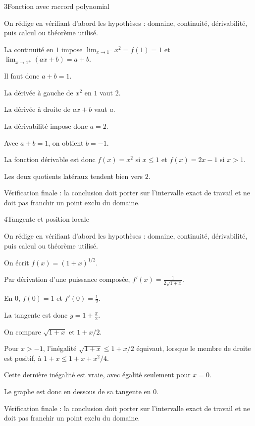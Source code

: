 \documentclass[11pt,a4paper]{article}
\begin{document}
\begin{corrbox}{3}{Fonction avec raccord polynomial}

\begin{methodebox}
On rédige en vérifiant d'abord les hypothèses : domaine, continuité, dérivabilité, puis calcul ou théorème utilisé.
\end{methodebox}

La continuité en $1$ impose $\lim_{x\to1^-}x^2=f(1)=1$ et $\lim_{x\to1^+}(ax+b)=a+b$.


Il faut donc $a+b=1$.


La dérivée à gauche de $x^2$ en $1$ vaut $2$.


La dérivée à droite de $ax+b$ vaut $a$.


La dérivabilité impose donc $a=2$.


Avec $a+b=1$, on obtient $b=-1$.


La fonction dérivable est donc $f(x)=x^2$ si $x\le1$ et $f(x)=2x-1$ si $x>1$.


Les deux quotients latéraux tendent bien vers $2$.


\begin{attentionbox}
Vérification finale : la conclusion doit porter sur l'intervalle exact de travail et ne doit pas franchir un point exclu du domaine.
\end{attentionbox}

\end{corrbox}


\begin{corrbox}{4}{Tangente et position locale}

\begin{methodebox}
On rédige en vérifiant d'abord les hypothèses : domaine, continuité, dérivabilité, puis calcul ou théorème utilisé.
\end{methodebox}

On écrit $f(x)=(1+x)^{1/2}$.


Par dérivation d'une puissance composée, $f'(x)=\frac1{2\sqrt{1+x}}$.


En $0$, $f(0)=1$ et $f'(0)=\frac12$.


La tangente est donc $y=1+\frac{x}{2}$.


On compare $\sqrt{1+x}$ et $1+x/2$.


Pour $x>-1$, l'inégalité $\sqrt{1+x}\le 1+x/2$ équivaut, lorsque le membre de droite est positif, à $1+x\le 1+x+x^2/4$.


Cette dernière inégalité est vraie, avec égalité seulement pour $x=0$.


Le graphe est donc en dessous de sa tangente en $0$.


\begin{attentionbox}
Vérification finale : la conclusion doit porter sur l'intervalle exact de travail et ne doit pas franchir un point exclu du domaine.
\end{attentionbox}

\end{corrbox}
\end{document}
